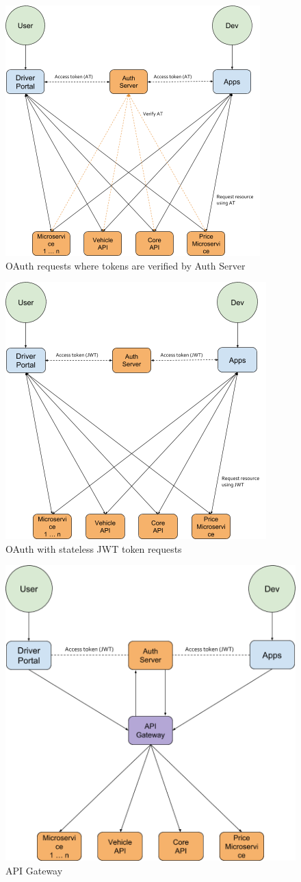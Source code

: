 \begin{figure}[ht!]
	\centering
	\includegraphics[width=.7\textwidth]{Auth1}
	\caption[oAuth 2.0]{OAuth requests where tokens are verified by Auth Server}
	\label{fig:Auth1}
\end{figure}
\clearpage
\begin{figure}[ht!]
	\centering
	\includegraphics[width=.7\textwidth]{Auth2}
	\caption[Stateless JWT]{OAuth with stateless JWT token requests}
	\label{fig:Auth2}
\end{figure}
\clearpage
\begin{figure}[ht!]
	\centering
	\includegraphics[width=.7\textwidth]{Auth3}
	\caption[API Gateway]{API Gateway}
	\label{fig:Auth3}
\end{figure}
